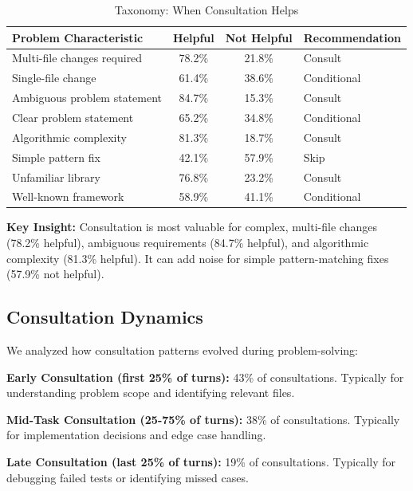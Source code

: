 \documentclass[11pt,a4paper]{article}
\begin{document}
\begin{table}[h]
\centering
\caption{Taxonomy: When Consultation Helps}
\label{tab:consultation_taxonomy}
\begin{tabular}{lccl}
\toprule
\textbf{Problem Characteristic} & \textbf{Helpful} & \textbf{Not Helpful} & \textbf{Recommendation} \\
\midrule
Multi-file changes required & 78.2\% & 21.8\% & \textcolor{green!60!black}{Consult} \\
Single-file change & 61.4\% & 38.6\% & Conditional \\
Ambiguous problem statement & 84.7\% & 15.3\% & \textcolor{green!60!black}{Consult} \\
Clear problem statement & 65.2\% & 34.8\% & Conditional \\
Algorithmic complexity & 81.3\% & 18.7\% & \textcolor{green!60!black}{Consult} \\
Simple pattern fix & 42.1\% & 57.9\% & \textcolor{red!60!black}{Skip} \\
Unfamiliar library & 76.8\% & 23.2\% & \textcolor{green!60!black}{Consult} \\
Well-known framework & 58.9\% & 41.1\% & Conditional \\
\bottomrule
\end{tabular}
\end{table}

\textbf{Key Insight:} Consultation is most valuable for complex, multi-file changes (78.2\% helpful), ambiguous requirements (84.7\% helpful), and algorithmic complexity (81.3\% helpful). It can add noise for simple pattern-matching fixes (57.9\% not helpful).

\subsection{Consultation Dynamics}

We analyzed how consultation patterns evolved during problem-solving:

\textbf{Early Consultation (first 25\% of turns):} 43\% of consultations. Typically for understanding problem scope and identifying relevant files.

\textbf{Mid-Task Consultation (25-75\% of turns):} 38\% of consultations. Typically for implementation decisions and edge case handling.

\textbf{Late Consultation (last 25\% of turns):} 19\% of consultations. Typically for debugging failed tests or identifying missed cases.
\end{document}
